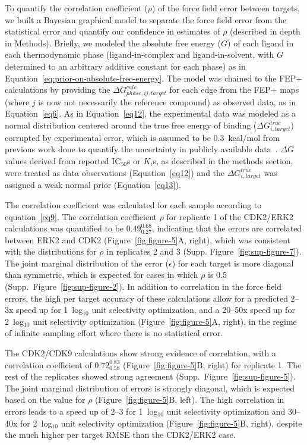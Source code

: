 \documentclass[phd,tocprelim]{cornell}
\begin{document}
To quantify the correlation coefficient ($\rho$) of the force field error between targets, we built a Bayesian graphical model to separate the force field error from the statistical error and quantify our confidence in estimates of $\rho$ (described in depth in Methods). 
Briefly, we modeled the absolute free energy ($G$) of each ligand in each thermodynamic phase (ligand-in-complex and ligand-in-solvent, with $G$ determined to an arbitrary additive constant for each phase) as in Equation~\ref{eq:prior-on-absolute-free-energy}. 
The model was chained to the FEP+ calculations by providing the $\Delta G^{calc}_{phase,ij,target}$ for each edge from the FEP+ maps (where $j$ is now not necessarily the reference compound) as observed data, as in Equation~\ref{eq6}. As in Equation~\ref{eq12}, the experimental data was modeled as a normal distribution centered around the true free energy of binding ($\Delta G^{true}_{i,target}$) corrupted by experimental error, which is assumed to be 0.3~kcal/mol from previous work done to quantify the uncertainty in publicly available data~\citep{BROWN2009420}. 
$\Delta G$ values derived from reported IC$_{50}$s or $K_i$s, as described in the methods section, were treated as data observations (Equation~\ref{eq12}) and the $\Delta G^{true}_{i,target}$ was assigned a weak normal prior (Equation~\ref{eq13}). 

The correlation coefficient was calculated for each sample according to equation~\ref{eq9}. 
The correlation coefficient $\rho$ for replicate 1 of the CDK2/ERK2 calculations was quantified to be $0.49^{0.68}_{0.27}$, indicating that the errors are correlated between ERK2 and CDK2 (Figure~\ref{fig:figure-5}A, right), which was consistent with the distributions for $\rho$ in replicates 2 and 3 (Supp. Figure~\ref{fig:sup-figure-7}). 
The joint marginal distribution of the error ($\epsilon$) for each target is more diagonal than symmetric, which is expected for cases in which $\rho$ is 0.5 (Supp.\ Figure~\ref{fig:sup-figure-2}). 
In addition to correlation in the force field errors, the high per target accuracy of these calculations allow for a predicted 2--3x speed up for 1~log$_{10}$ unit selectivity optimization, and a 20--50x speed up for 2~log$_{10}$ unit selectivity optimization (Figure~\ref{fig:figure-5}A, right), in the regime of infinite sampling effort where there is no statistical error. 

The CDK2/CDK9 calculations show strong evidence of correlation, with a correlation coefficient of $0.72^{0.83}_{0.58}$ (Figure~\ref{fig:figure-5}B, right) for replicate 1. 
The rest of the replicates showed strong agreement (Supp.\ Figure~\ref{fig:sup-figure-5}). The joint marginal distribution of errors is strongly diagonal, which is expected based on the value for $\rho$ (Figure~\ref{fig:figure-5}B, left). 
The high correlation in errors leads to a speed up of 2--3 for 1~log$_{10}$ unit selectivity optimization and 30--40x for 2~log$_{10}$ unit selectivity optimization (Figure~\ref{fig:figure-5}B, right), despite the much higher per target RMSE than the CDK2/ERK2 case. 
\end{document}
